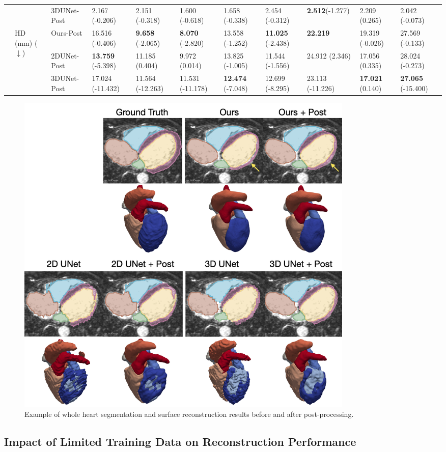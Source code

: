 \documentclass[times,review,preprint,authoryear]{elsarticle}
\begin{document}
\begin{table}
{{\begin{tabular}{lllllllllll}
   &         & 3DUNet-Post &   2.167 (-0.206) &   2.151 (-0.318) &   1.600 (-0.618) &   1.658 (-0.338) &   2.454 (-0.312) &   \textbf{2.512}(-1.277) &   2.209 (0.265) &   2.042 (-0.073)\\
\cline{2-11}
   & \multirow{3}{*}{HD (mm) ($\downarrow$)} & Ours-Post &  16.516 (-0.406) &   \textbf{9.658} (-2.065) &   \textbf{8.070} (-2.820) &  13.558 (-1.252) &  \textbf{11.025} (-2.438) &  \textbf{22.219} &  19.319 (-0.026) &  27.569 (-0.133) \\
   &         & 2DUNet-Post &  \textbf{13.759} (-5.398) &  11.185 (0.404) &   9.972 (0.014) &  13.825 (-1.005) &  11.544 (-1.556) &  24.912 (2.346) &  17.056 (0.335) &  28.024 (-0.273) \\
   &         & 3DUNet-Post &  17.024 (-11.432) &  11.564 (-12.263) &  11.531 (-11.178) &  \textbf{12.474} (-7.048) &  12.699 (-8.295) &  23.113 (-11.226) &  \textbf{17.021} (0.140) &  \textbf{27.065} (-15.400) \\
\bottomrule
\end{tabular}
}}
\end{table}

\begin{figure}[H]
{\color{black}
\centering
\includegraphics[width=0.8\textwidth]{post_process}
\caption{Example of whole heart segmentation and surface reconstruction results before and after post-processing.} \label{figure:post}
}
\end{figure}

\subsection{Impact of Limited Training Data on Reconstruction Performance  }
\end{document}
